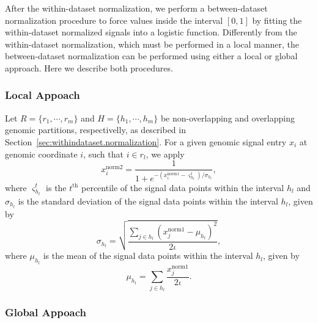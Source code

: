 After the within-dataset normalization, we perform a between-dataset normalization procedure to force values inside the interval $ [0,1] $ by fitting the within-dataset normalized signals into a logistic function. Differently from the within-dataset normalization, which must be performed in a local manner, the between-dataset normalization can be performed using either a local or global approach. Here we describe both procedures.

\subsubsection{Local Appoach}

Let ${R} = \{ {r}_{1}, \cdots, {r}_{m} \}$ and ${H} = \{ {h}_{1}, \cdots, {h}_{m} \}$ be non-overlapping and overlapping genomic partitions, respectivelly, as described in Section~\ref{sec:withindataset.normalization}. For a given genomic signal entry $x_i$ at genomic coordinate $i$, such that $i \in {r}_{l}$, we apply
\begin{equation}
  \label{eq:signal.between.norm.local}
  {x}^{\text{norm2}}_{i} = \frac{1}{1+e^{{-({x}^{\text{norm1}}_{i}-{\varsigma}^{t}_{{h}_{l}})}/{\sigma}_{{h}_{l}}}},
\end{equation}
where ${\varsigma}^{t}_{{h}_{l}}$ is the $t^{\text{th}}$ percentile of the signal data points within the interval ${h}_{l}$ and $\sigma_{{h}_{l}}$ is the standard deviation of the signal data points within the interval ${h}_{l}$, given by
\begin{equation}
  \label{eq:signal.between.var.local}
  \sigma_{{h}_{l}} = \sqrt{ \frac{\sum_{j \in {h}_{l}} \left({x}^{\text{norm1}}_{j} - \mu_{{h}_{l}}\right)^2}{2\iota} },
\end{equation}
where $\mu_{{h}_{l}}$ is the mean of the signal data points within the interval ${h}_{l}$, given by
\begin{equation}
  \label{eq:signal.between.mean.local}
  \mu_{{h}_{l}} = \sum_{j \in {h}_{l}} \frac{{x}^{\text{norm1}}_{j}}{2\iota}.
\end{equation}

\subsubsection{Global Appoach}

